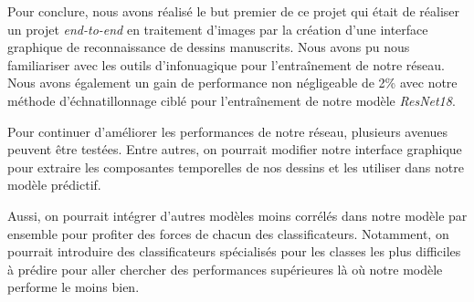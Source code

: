 Pour conclure, nous avons réalisé le but premier de ce projet qui était de réaliser un projet \emph{end-to-end} en traitement d'images par la création d'une interface graphique de reconnaissance de dessins manuscrits. 
Nous avons pu nous familiariser avec les outils d'infonuagique pour l'entraînement de notre réseau. 
Nous avons également un gain de performance non négligeable de 2\% avec notre méthode d'échnatillonnage ciblé pour l'entraînement de notre modèle \emph{ResNet18}.

Pour continuer d'améliorer les performances de notre réseau, plusieurs avenues peuvent être testées.
Entre autres, on pourrait modifier notre interface graphique pour extraire les composantes temporelles de nos dessins et les utiliser dans notre modèle prédictif.

Aussi, on pourrait intégrer d'autres modèles moins corrélés dans notre modèle par ensemble pour profiter des forces de chacun des classificateurs.
Notamment, on pourrait introduire des classificateurs spécialisés pour les classes les plus difficiles à prédire pour aller chercher des performances supérieures là où notre modèle performe le moins bien.
